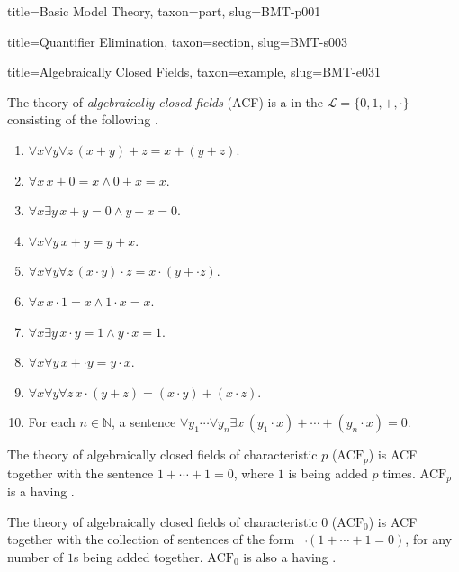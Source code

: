\documentclass[a4paper]{article}
\begin{document}
\begin{tree}{title={Basic Model Theory}, taxon={part}, slug={BMT-p001}}
\begin{tree}{title={Quantifier Elimination}, taxon={section}, slug={BMT-s003}}
  
\begin{tree}{title={Algebraically Closed Fields}, taxon={example}, slug={BMT-e031}}

    The theory of \emph{algebraically closed fields} (ACF) is a  in the  \(\mathcal  L= \{ 0,1,+, \cdot \}\)
    consisting of the following .
    \begin{enumerate}
\item{\(\forall  x \forall  y \forall  z \, (x+y)+z=x+(y+z)\).
        }
        \item{\(\forall  x \, x+0=x \land0 +x=x\).
        }
        \item{\(\forall  x \exists  y \, x+y=0 \land  y+x=0\).
        }
        \item{\(\forall  x \forall  y \, x+y=y+x\).
        }
        \item{\(\forall  x \forall  y \forall  z \, (x \cdot  y) \cdot  z=x \cdot  (y+ \cdot  z)\).
        }
        \item{\(\forall  x \, x \cdot1 =x \land1 \cdot  x=x\).
        }
        \item{\(\forall  x \exists  y \, x \cdot  y=1 \land  y \cdot  x=1\).
        }
        \item{\(\forall  x \forall  y \, x+ \cdot  y=y \cdot  x\).
        }
        \item{\(\forall  x \forall  y \forall  z \, x \cdot (y+z)=(x \cdot  y)+(x \cdot  z)\).
        }
        \item{
            For each \(n \in \mathbb  N\), a sentence \(\forall  y_1 \cdots \forall  y_n \exists  x \, (y_1 \cdot  x)+ \cdots +(y_n \cdot  x)=0\).
        }
\end{enumerate}\par{
    The theory of algebraically closed fields of characteristic \(p\) (\(\text {ACF}_p\)) is ACF together with the sentence
    \(1+ \cdots +1=0\), where \(1\) is being added \(p\) times. \(\text {ACF}_p\) is a  having
    .
}\par{
    The theory of algebraically closed fields of characteristic \(0\) (\(\text {ACF}_0\)) is ACF together with the collection of sentences
    of the form \(\neg (1+ \cdots +1=0)\), for any number of \(1\)s being added together. \(\text {ACF}_0\) is also a
     having .
}
\end{tree}



\end{tree}
\end{tree}
\end{document}
